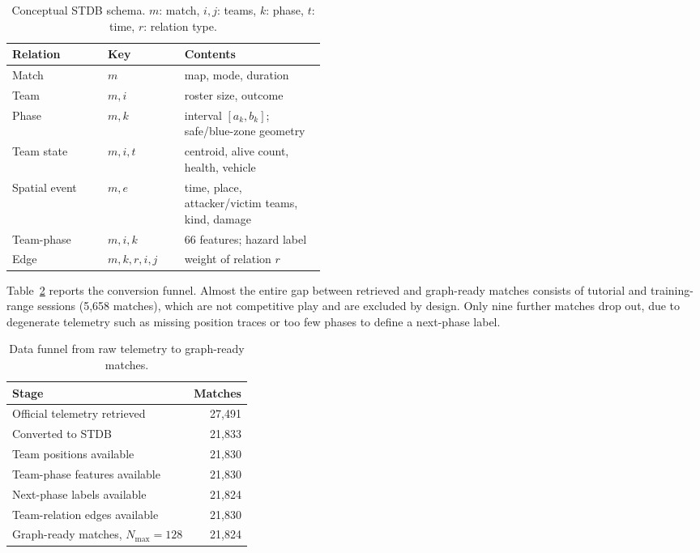 \begin{table}[t]
\centering
\caption{Conceptual STDB schema. \(m\): match, \(i,j\): teams, \(k\): phase,
\(t\): time, \(r\): relation type.}
\label{tab:stdb-schema}
\small
\begin{tabular}{llp{0.45\linewidth}}
\toprule
Relation & Key & Contents \\
\midrule
Match & \(m\) & map, mode, duration \\
Team & \(m,i\) & roster size, outcome \\
Phase & \(m,k\) & interval \([a_k,b_k]\); safe/blue-zone geometry \\
Team state & \(m,i,t\) & centroid, alive count, health, vehicle \\
Spatial event & \(m,e\) & time, place, attacker/victim teams, kind, damage \\
Team-phase & \(m,i,k\) & 66 features; hazard label \\
Edge & \(m,k,r,i,j\) & weight of relation \(r\) \\
\bottomrule
\end{tabular}
\end{table}

Table~\ref{tab:data-funnel} reports the conversion funnel. Almost the entire
gap between retrieved and graph-ready matches consists of tutorial and
training-range sessions (5,658 matches), which are not competitive play and
are excluded by design. Only nine further matches drop out, due to degenerate
telemetry such as missing position traces or too few phases to define a
next-phase label.

\begin{table}[t]
\centering
\caption{Data funnel from raw telemetry to graph-ready matches.}
\label{tab:data-funnel}
\small
\begin{tabular}{lr}
\toprule
Stage & Matches \\
\midrule
Official telemetry retrieved & 27,491 \\
Converted to STDB & 21,833 \\
Team positions available & 21,830 \\
Team-phase features available & 21,830 \\
Next-phase labels available & 21,824 \\
Team-relation edges available & 21,830 \\
Graph-ready matches, \(N_{\max}=128\) & 21,824 \\
\bottomrule
\end{tabular}
\end{table}

